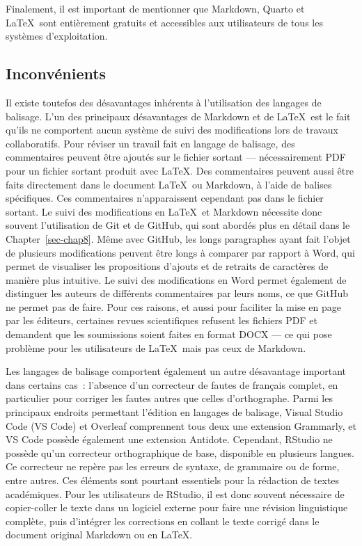 \documentclass[
  letterpaper,
]{scrbook}
\begin{document}
Finalement, il est important de mentionner que Markdown, Quarto et
\LaTeX~sont entièrement gratuits et accessibles aux utilisateurs de tous
les systèmes d'exploitation.

\hypertarget{inconvuxe9nients}{%
\subsection{Inconvénients}\label{inconvuxe9nients}}

Il existe toutefos des désavantages inhérents à l'utilisation des
langages de balisage. L'un des principaux désavantages de Markdown et de
\LaTeX~est le fait qu'ils ne comportent aucun système de suivi des
modifications lors de travaux collaboratifs. Pour réviser un travail
fait en langage de balisage, des commentaires peuvent être ajoutés sur
le fichier sortant --- nécessairement PDF pour un fichier sortant
produit avec \LaTeX. Des commentaires peuvent aussi être faits
directement dans le document \LaTeX~ou Markdown, à l'aide de balises
spécifiques. Ces commentaires n'apparaissent cependant pas dans le
fichier sortant. Le suivi des modifications en \LaTeX~et Markdown
nécessite donc souvent l'utilisation de Git et de GitHub, qui sont
abordés plus en détail dans le Chapter~\ref{sec-chap8}. Même avec
GitHub, les longs paragraphes ayant fait l'objet de plusieurs
modifications peuvent être longs à comparer par rapport à Word, qui
permet de visualiser les propositions d'ajouts et de retraits de
caractères de manière plus intuitive. Le suivi des modifications en Word
permet également de distinguer les auteurs de différents commentaires
par leurs noms, ce que GitHub ne permet pas de faire. Pour ces raisons,
et aussi pour faciliter la mise en page par les éditeurs, certaines
revues scientifiques refusent les fichiers PDF et demandent que les
soumissions soient faites en format DOCX --- ce qui pose problème pour
les utilisateurs de \LaTeX~mais pas ceux de Markdown.

Les langages de balisage comportent également un autre désavantage
important dans certains cas~: l'absence d'un correcteur de fautes de
français complet, en particulier pour corriger les fautes autres que
celles d'orthographe. Parmi les principaux endroits permettant l'édition
en langages de balisage, Visual Studio Code (VS Code) et Overleaf
comprennent tous deux une extension Grammarly, et VS Code possède
également une extension Antidote. Cependant, RStudio ne possède qu'un
correcteur orthographique de base, disponible en plusieurs langues. Ce
correcteur ne repère pas les erreurs de syntaxe, de grammaire ou de
forme, entre autres. Ces éléments sont pourtant essentiels pour la
rédaction de textes académiques. Pour les utilisateurs de RStudio, il
est donc souvent nécessaire de copier-coller le texte dans un logiciel
externe pour faire une révision linguistique complète, puis d'intégrer
les corrections en collant le texte corrigé dans le document original
Markdown ou en \LaTeX.
\end{document}
